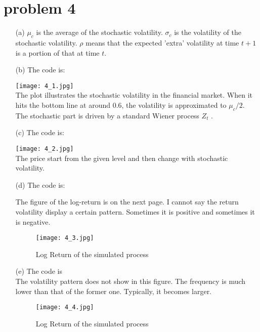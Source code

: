 \documentclass[11pt]{amsart}
\theoremstyle{definition}
\begin{document}
\section*{problem 4}
\begin{enumerate}
    \item [(a)] $\mu_{c}$ is the average of the stochastic volatility. $\sigma_{c}$ is the volatility of the stochastic volatility. $\rho$ means that the expected 'extra' volatility at time $t+1$ is a portion of that at time $t$. 
    \item [(b)] The code is:
    
    \texttt{[image: 4\_1.jpg]}\\
    The plot illustrates the stochastic volatility in the financial market. When it hits the bottom line at around $0.6$, the volatility is approximated to $\mu_{c}/2$. The stochastic part is driven by a standard Wiener process $Z_{t}$ .
\clearpage
    \item[(c)] The code is:
    
    \texttt{[image: 4\_2.jpg]}\\
    The price start from the given level and then change with stochastic volatility.
\clearpage
    \item[(d)] The code is:
    
    The figure of the log-return is on the next page. I cannot say the return volatility display a certain pattern. Sometimes it is positive and sometimes it is negative.
\begin{figure}[htbp]
    \centering
    \texttt{[image: 4\_3.jpg]}
    \caption{Log Return of the simulated process}
\end{figure}
\clearpage
    \item[(e)] The code is 
    \\
    The volatility pattern does not show in this figure. The frequency is much lower than that of the former one. Typically, it becomes larger.
\begin{figure}[htbp]
    \centering
    \texttt{[image: 4\_4.jpg]}
    \caption{Log Return of the simulated process}
\end{figure}

\end{enumerate}
\end{document}
